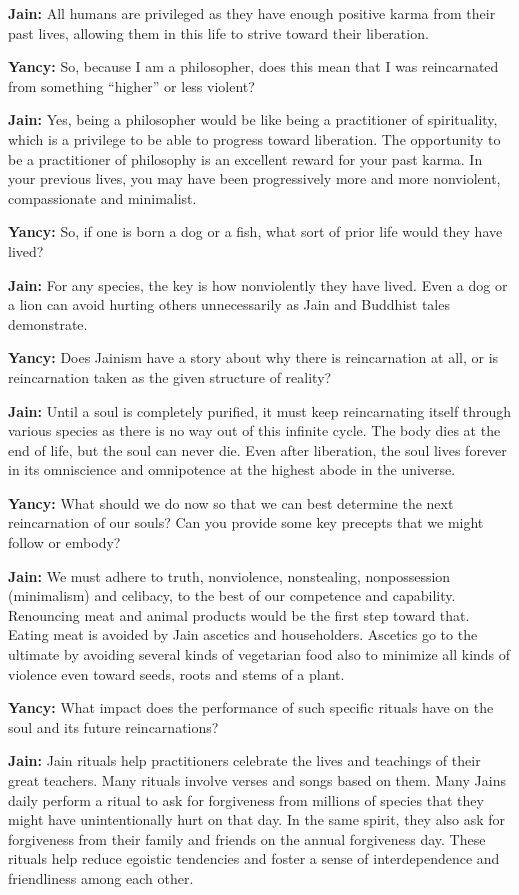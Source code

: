 \textbf{Jain:} All humans are privileged as they have enough positive
karma from their past lives, allowing them in this life to strive toward
their liberation.

\textbf{Yancy:} So, because I am a philosopher, does this mean that I
was reincarnated from something ``higher'' or less violent?

\textbf{Jain:} Yes, being a philosopher would be like being a
practitioner of spirituality, which is a privilege to be able to
progress toward liberation. The opportunity to be a practitioner of
philosophy is an excellent reward for your past karma. In your previous
lives, you may have been progressively more and more nonviolent,
compassionate and minimalist.

\textbf{Yancy:} So, if one is born a dog or a fish, what sort of prior
life would they have lived?

\textbf{Jain:} For any species, the key is how nonviolently they have
lived. Even a dog or a lion can avoid hurting others unnecessarily as
Jain and Buddhist tales demonstrate.

\textbf{Yancy:} Does Jainism have a story about why there is
reincarnation at all, or is reincarnation taken as the given structure
of reality?

\textbf{Jain:} Until a soul is completely purified, it must keep
reincarnating itself through various species as there is no way out of
this infinite cycle. The body dies at the end of life, but the soul can
never die. Even after liberation, the soul lives forever in its
omniscience and omnipotence at the highest abode in the universe.

\textbf{Yancy:} What should we do now so that we can best determine the
next reincarnation of our souls? Can you provide some key precepts that
we might follow or embody?

\textbf{Jain:} We must adhere to truth, nonviolence, nonstealing,
nonpossession (minimalism) and celibacy, to the best of our competence
and capability. Renouncing meat and animal products would be the first
step toward that. Eating meat is avoided by Jain ascetics and
householders. Ascetics go to the ultimate by avoiding several kinds of
vegetarian food also to minimize all kinds of violence even toward
seeds, roots and stems of a plant.

\textbf{Yancy:} What impact does the performance of such specific
rituals have on the soul and its future reincarnations?

\textbf{Jain:} Jain rituals help practitioners celebrate the lives and
teachings of their great teachers. Many rituals involve verses and songs
based on them. Many Jains daily perform a ritual to ask for forgiveness
from millions of species that they might have unintentionally hurt on
that day. In the same spirit, they also ask for forgiveness from their
family and friends on the annual forgiveness day. These rituals help
reduce egoistic tendencies and foster a sense of interdependence and
friendliness among each other.

